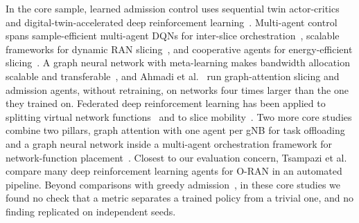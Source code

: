 \documentclass[pdflatex,sn-basic,Numbered]{sn-jnl}
\begin{document}
In the core sample, learned admission control uses sequential twin actor-critics~\cite{ojijo2024sac} and digital-twin-accelerated deep reinforcement learning~\cite{tao2025dtac}. Multi-agent control spans sample-efficient multi-agent DQNs for inter-slice orchestration~\cite{doanis2024madqn}, scalable frameworks for dynamic RAN slicing~\cite{li2026scalablemarl}, and cooperative agents for energy-efficient slicing~\cite{phyu2025icecream}. A graph neural network with meta-learning makes bandwidth allocation scalable and transferable~\cite{hao2024hybridtask}, and Ahmadi et al.~\cite{ahmadi2024generalizable} run graph-attention slicing and admission agents, without retraining, on networks four times larger than the one they trained on. Federated deep reinforcement learning has been applied to splitting virtual network functions~\cite{amiri2024vnf} and to slice mobility~\cite{ming2024fedslice}. Two more core studies combine two pillars, graph attention with one agent per gNB for task offloading~\cite{mohajer2026pronto} and a graph neural network inside a multi-agent orchestration framework for network-function placement~\cite{bouroudi2025gnnmarl}. Closest to our evaluation concern, Tsampazi et al.~\cite{tsampazi2025pandora} compare many deep reinforcement learning agents for O-RAN in an automated pipeline. Beyond comparisons with greedy admission~\cite{ahmadi2024generalizable}, in these core studies we found no check that a metric separates a trained policy from a trivial one, and no finding replicated on independent seeds.
\end{document}
